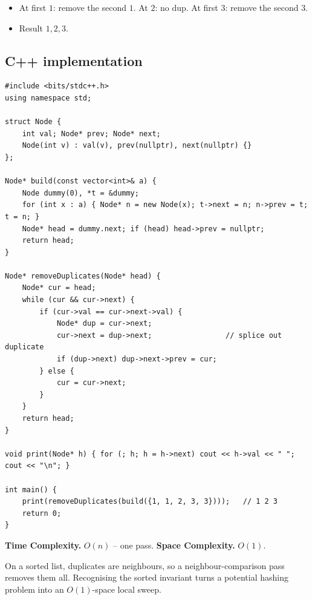 
\begin{itemize}
  \item At first $1$: remove the second $1$. At $2$: no dup. At first $3$:
        remove the second $3$.
  \item Result $1,2,3$.
\end{itemize}

\subsection*{C++ implementation}

\begin{lstlisting}
#include <bits/stdc++.h>
using namespace std;

struct Node {
    int val; Node* prev; Node* next;
    Node(int v) : val(v), prev(nullptr), next(nullptr) {}
};

Node* build(const vector<int>& a) {
    Node dummy(0), *t = &dummy;
    for (int x : a) { Node* n = new Node(x); t->next = n; n->prev = t; t = n; }
    Node* head = dummy.next; if (head) head->prev = nullptr;
    return head;
}

Node* removeDuplicates(Node* head) {
    Node* cur = head;
    while (cur && cur->next) {
        if (cur->val == cur->next->val) {
            Node* dup = cur->next;
            cur->next = dup->next;                 // splice out duplicate
            if (dup->next) dup->next->prev = cur;
        } else {
            cur = cur->next;
        }
    }
    return head;
}

void print(Node* h) { for (; h; h = h->next) cout << h->val << " "; cout << "\n"; }

int main() {
    print(removeDuplicates(build({1, 1, 2, 3, 3})));   // 1 2 3
    return 0;
}
\end{lstlisting}

\begin{complexitybox}
\textbf{Time Complexity.} $O(n)$ -- one pass. \textbf{Space Complexity.}
$O(1)$.
\end{complexitybox}

\begin{takeawaybox}
On a sorted list, duplicates are neighbours, so a neighbour-comparison pass
removes them all. Recognising the sorted invariant turns a potential
hashing problem into an $O(1)$-space local sweep.
\end{takeawaybox}
